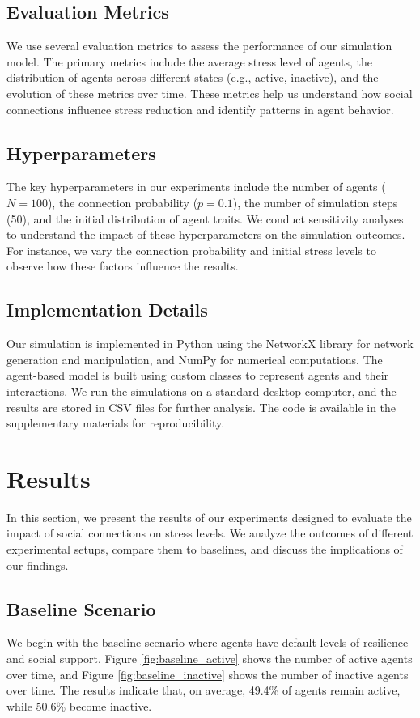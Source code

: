 \documentclass{article} %
\begin{document}
\subsection{Evaluation Metrics}
We use several evaluation metrics to assess the performance of our simulation model. The primary metrics include the average stress level of agents, the distribution of agents across different states (e.g., active, inactive), and the evolution of these metrics over time. These metrics help us understand how social connections influence stress reduction and identify patterns in agent behavior.

\subsection{Hyperparameters}
The key hyperparameters in our experiments include the number of agents ($N=100$), the connection probability ($p=0.1$), the number of simulation steps (50), and the initial distribution of agent traits. We conduct sensitivity analyses to understand the impact of these hyperparameters on the simulation outcomes. For instance, we vary the connection probability and initial stress levels to observe how these factors influence the results.

\subsection{Implementation Details}
Our simulation is implemented in Python using the NetworkX library for network generation and manipulation, and NumPy for numerical computations. The agent-based model is built using custom classes to represent agents and their interactions. We run the simulations on a standard desktop computer, and the results are stored in CSV files for further analysis. The code is available in the supplementary materials for reproducibility.

\section{Results}
\label{sec:results}

In this section, we present the results of our experiments designed to evaluate the impact of social connections on stress levels. We analyze the outcomes of different experimental setups, compare them to baselines, and discuss the implications of our findings.

\subsection{Baseline Scenario}
We begin with the baseline scenario where agents have default levels of resilience and social support. Figure \ref{fig:baseline_active} shows the number of active agents over time, and Figure \ref{fig:baseline_inactive} shows the number of inactive agents over time. The results indicate that, on average, 49.4\% of agents remain active, while 50.6\% become inactive.
\end{document}
